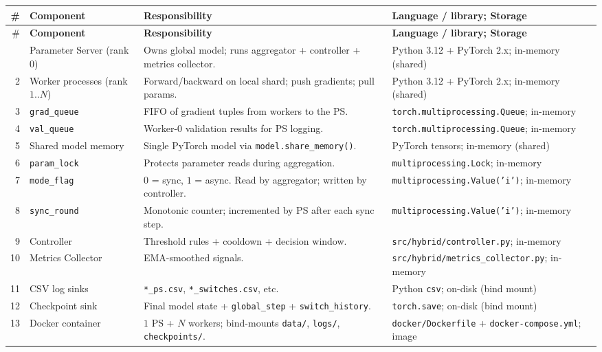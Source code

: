 \documentclass[11pt,a4paper]{article}
\begin{document}
{\footnotesize
\begin{longtable}{@{}r L L L@{}}
  \toprule
  \# & \textbf{Component} & \textbf{Responsibility} & \textbf{Language / library; Storage} \\
  \midrule
  \endfirsthead
  \toprule
  \# & \textbf{Component} & \textbf{Responsibility} & \textbf{Language / library; Storage} \\
  \midrule
  \endhead
  \bottomrule
   & Parameter Server (rank 0) & Owns global model; runs aggregator + controller + metrics collector. & Python 3.12 + PyTorch 2.x; in-memory (shared) \\
  2 & Worker processes (rank $1..N$) & Forward/backward on local shard; push gradients; pull params. & Python 3.12 + PyTorch 2.x; in-memory (shared) \\
  3 & \texttt{grad\_queue} & FIFO of gradient tuples from workers to the PS. & \texttt{torch.multiprocessing.Queue}; in-memory \\
  4 & \texttt{val\_queue} & Worker-0 validation results for PS logging. & \texttt{torch.multiprocessing.Queue}; in-memory \\
  5 & Shared model memory & Single PyTorch model via \texttt{model.share\_memory()}. & PyTorch tensors; in-memory (shared) \\
  6 & \texttt{param\_lock} & Protects parameter reads during aggregation. & \texttt{multiprocessing.Lock}; in-memory \\
  7 & \texttt{mode\_flag} & $0$ = sync, $1$ = async. Read by aggregator; written by controller. & \texttt{multiprocessing.Value('i')}; in-memory \\
  8 & \texttt{sync\_round} & Monotonic counter; incremented by PS after each sync step. & \texttt{multiprocessing.Value('i')}; in-memory \\
  9 & Controller & Threshold rules + cooldown + decision window. & \texttt{src/hybrid/controller.py}; in-memory \\
  10 & Metrics Collector & EMA-smoothed signals. & \texttt{src/hybrid/metrics\_collector.py}; in-memory \\
  11 & CSV log sinks & \texttt{*\_ps.csv}, \texttt{*\_switches.csv}, etc. & Python \texttt{csv}; on-disk (bind mount) \\
  12 & Checkpoint sink & Final model state + \texttt{global\_step} + \texttt{switch\_history}. & \texttt{torch.save}; on-disk (bind mount) \\
  13 & Docker container & $1$ PS + $N$ workers; bind-mounts \texttt{data/}, \texttt{logs/}, \texttt{checkpoints/}. & \texttt{docker/Dockerfile} + \texttt{docker-compose.yml}; image \\
\end{longtable}
}
\end{document}
